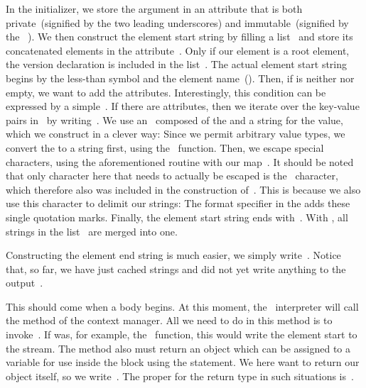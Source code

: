 In the initializer, we store the  argument in an attribute that is both private~(signified by the two leading underscores) and immutable~(signified by the ~).
We then construct the element start string by filling a list~ and store its concatenated elements in the attribute~.
Only if our element is a root element, the  version declaration is included in the list~.
The actual element start string begins by the less-than symbol and the element name~().
Then, if  is neither  nor empty, we want to add the attributes.
Interestingly, this condition can be expressed by a simple~.
If there are attributes, then we iterate over the key-value pairs in~ by writing~.
We use an~ composed of the  and a string for the value, which we construct in a clever way:
Since we permit arbitrary value types, we convert the  to a string first, using the ~function.
Then, we escape special characters, using the aforementioned  routine with our map~.
It should be noted that only character here that needs to actually be escaped is the ~character, which therefore also was included in the construction of~.
This is because we also use this character to delimit our strings:
The  format specifier in the  adds these single quotation marks.
Finally, the element start string ends with~.
With , all strings in the list~ are merged into one.%
%
\begin{sloppypar}%
Constructing the element end string is much easier, we simply write~.
Notice that, so far, we have just cached strings and did not yet write anything to the output~.%
\end{sloppypar}%
%
\begin{sloppypar}%
This should come when a  body begins.
At this moment, the \python~interpreter will call the method  of the context manager.
All we need to do in this method is to invoke~.
If  was, for example, the ~function, this would write the element start to the  stream.
The method  also must return an object which can be assigned to a variable for use inside the  block using the  statement.
We here want to return our  object itself, so we write~.
The proper  for the return type in such situations is~.%
\end{sloppypar}%
